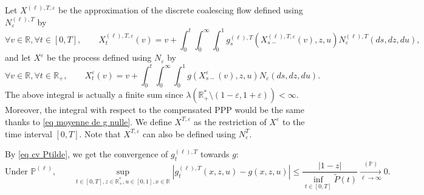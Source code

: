 \documentclass[11pt]{article}
\numberwithin{equation}{section}
\def\vp{\varepsilon}
\def \R{\mathbb {R}}
\def\P{\mathbb{P}}
\begin{document}
Let $X^{(\ell),T,\vp}$ be the approximation of the discrete coalescing flow defined using $N^{(\ell), T}_\vp$ by 
$$
\forall v \in \R, \forall t \in [0,T], \qquad
X^{(\ell),T,\vp}_t(v) = v+ \int_0^t \int_0^\infty \int_0^1 g_s^{(\ell),T}(X^{(\ell),T,\vp}_{s-}(v),z,u) N^{(\ell), T}_\vp(ds,dz,du),
$$
and let $X^\vp$ be the process defined using $N_\vp$ by
$$
\forall v \in \R, \forall t \in \R_+, \qquad
X^{\vp}_t(v) = v+ \int_0^t \int_0^\infty \int_0^1 g(X^{\vp}_{s-}(v),z,u) N_\vp(ds,dz,du).
$$
The above integral is actually a finite sum since $\lambda(\R_+^* \setminus(1-\vp,1+\vp))<\infty$. Moreover, the integral with respect to the compensated PPP would be the same thanks to \eqref{eq moyenne de g nulle}. We define $X^{T,\vp}$ as the restriction of $X^\vp$ to the time interval $[0,T]$. Note that $X^{T,\vp}$ can also be defined using $N^T_\vp$.

By \eqref{eq cv Ptilde}, we get the convergence of $g^{(\ell),T}_t$ towards $g$:
\begin{equation}\label{eq cv g}
	\text{Under } \P^{(\ell)}, \qquad
	\sup_{t \in [0,T], z \in \R_+^*, u \in [0,1] , x \in \R} \left\vert g^{(\ell),T}_t(x,z,u)- g(x,z,u) \right\vert 
	\le \frac{\vert1-z \vert}{\inf_{t \in [0,T]} \widetilde{P}(t)}
	\mathop{\longrightarrow}\limits_{\ell \to \infty}^{(\P)} 0.
\end{equation}
\end{document}
